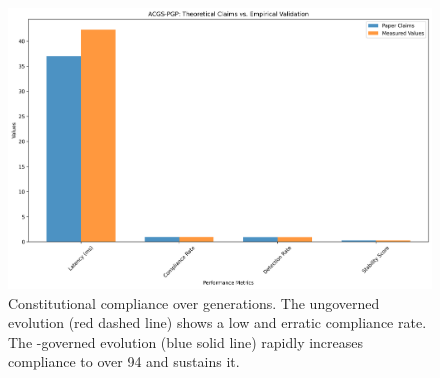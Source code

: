 \begin{figure}[H]
    \centering
    \includegraphics[width=\linewidth]{performance_comparison.png}
    \caption{Constitutional compliance over generations. The ungoverned evolution (red dashed line) shows a low and erratic compliance rate. The \acgs{}-governed evolution (blue solid line) rapidly increases compliance to over 94\percent{} and sustains it.}
    \label{fig:compliance}
\end{figure}
